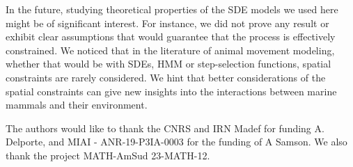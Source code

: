 \documentclass[aoas]{imsart}
\theoremstyle{definition}
\theoremstyle{remark}
\theoremstyle{remark}
\newcommand {\1}{\mathbb{1}}
\begin{document}
In the future, studying theoretical properties of the SDE models we used here might be of significant interest. For instance, we did not prove any result or exhibit clear assumptions that would guarantee that the process is effectively constrained. We noticed that in the literature of animal movement modeling, whether that would be with SDEs, HMM or step-selection functions, spatial constraints are rarely considered. We hint that better considerations of the spatial constraints can give new insights into the interactions between marine mammals and their environment.




\begin{funding}
The authors would like to thank the CNRS and IRN Madef for funding A. Delporte, and MIAI - ANR-19-P3IA-0003 for the funding of A Samson.
We also thank the project MATH-AmSud 23-MATH-12.
\end{funding}

\begin{supplement}
\end{supplement}
\end{document}
